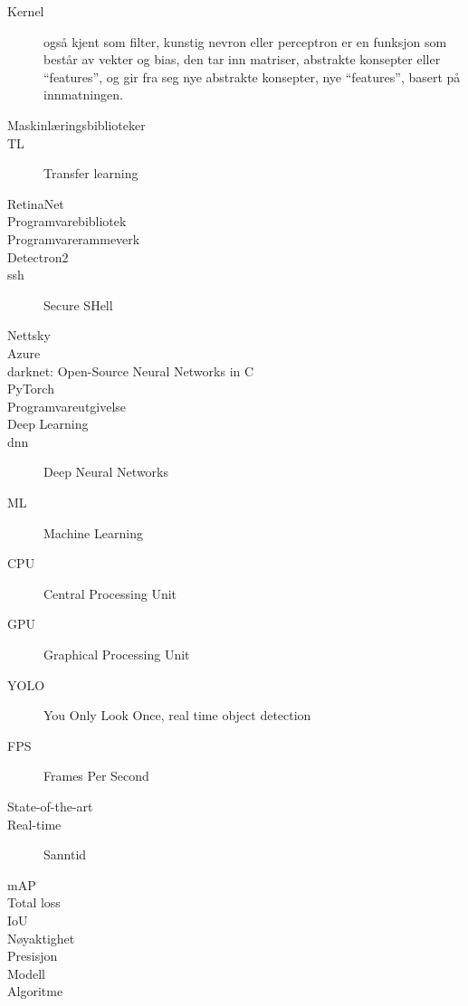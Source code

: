 \begin{description}
\item[Kernel] også kjent som filter, kunstig nevron eller perceptron er en funksjon som består av vekter og bias, den tar inn matriser, abstrakte konsepter eller ``features'', og gir fra seg nye abstrakte konsepter, nye ``features'', basert på innmatningen.
\item[Maskinlæringsbiblioteker]
\item[TL] Transfer learning
\item[RetinaNet]
\item[Programvarebibliotek]
\item[Programvarerammeverk]
\item[Detectron2]
\item[ssh] Secure SHell
\item[Nettsky]
\item[Azure]
\item[darknet: Open-Source Neural Networks in C]
\item[PyTorch]
\item[Programvareutgivelse]
\item[Deep Learning]
\item[dnn] Deep Neural Networks
\item[ML] Machine Learning
\item[CPU] Central Processing Unit
\item[GPU] Graphical Processing Unit
\item[YOLO] You Only Look Once, real time object detection
\item[FPS] Frames Per Second
\item[State-of-the-art] 
\item[Real-time] Sanntid
\item[mAP] 
\item[Total loss]
\item[IoU] 
\item[Nøyaktighet] 
\item[Presisjon] 
\item[Modell] 
\item[Algoritme]


\end{description}